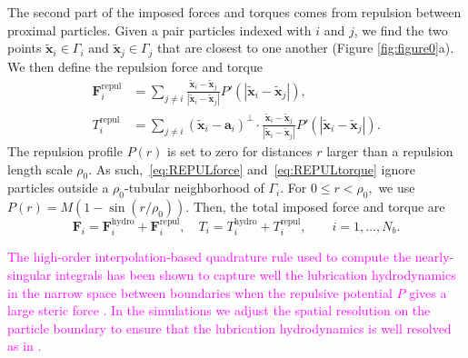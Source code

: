 \documentclass[lineno]{jfm}
\renewcommand{\aa}{\mathbf{a}}
\newcommand{\FF}{\mathbf{F}}
\newcommand{\xx}{\mathbf{x}}
\newcommand{\ReviewerThree}[1]{\textcolor{magenta}{#1}}
\begin{document}
The second part of the imposed forces and torques comes from repulsion
between proximal particles. Given a pair particles indexed with $i$ and
$j$, we find the two points $\tilde{\xx}_i \in \Gamma_i$ and
$\tilde{\xx}_j \in \Gamma_j$ that are closest to one another (Figure \ref{fig:figure0}a). We then
define the repulsion force and torque
\begin{align}
  \label{eq:REPULforce}
  \FF_i^{\text{repul}} &= \sum_{j \neq i} 
    \frac{\tilde{\xx}_i - \tilde{\xx}_j}
    {|\tilde{\xx}_i - \tilde{\xx}_j|} 
    P'(|\tilde{\xx}_i - \tilde{\xx}_j|), \\
  \label{eq:REPULtorque}
  T_i^{\text{repul}} &= \sum_{j \neq i} 
    (\tilde{\xx}_i - \aa_i)^{\perp} \cdot 
    \frac{\tilde{\xx}_i - \tilde{\xx}_j}
    {|\tilde{\xx}_i - \tilde{\xx}_j|} 
    P'(|\tilde{\xx}_i - \tilde{\xx}_j|).
\end{align}
The repulsion profile $P(r)$ is set to zero for distances $r$ larger than a
repulsion length scale $\rho_0$. As such,~\eqref{eq:REPULforce}
and~\eqref{eq:REPULtorque} ignore particles outside a
$\rho_0$-tubular neighborhood of $\Gamma_i$. For $0 \leq r < \rho_0,$ we use
$P(r) = M(1 - \sin(r/\rho_0))$.
Then, the total imposed force and torque
are
\begin{equation}
\label{eq:total_forces}
  \FF_i = \FF_i^{\text{hydro}} + \FF_i^{\text{repul}},\quad
  T_i = T_i^{\text{hydro}} + T_i^{\text{repul}}, \qquad
  i=1,\ldots,N_b.
\end{equation}

\ReviewerThree{
The high-order interpolation-based quadrature rule used to compute the nearly-singular integrals has
been shown to capture well the lubrication hydrodynamics in the narrow space between boundaries 
when the repulsive potential $P$ gives a large steric force \citep{qua-bir2014}.  
In the simulations we adjust the spatial resolution on the particle boundary to ensure that the lubrication hydrodynamics is well resolved as in \citep{qua-vee-you2019,qua-gan-you2021}.
}
%



\end{document}
